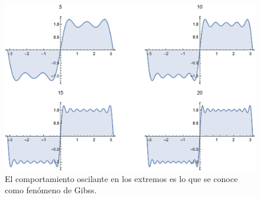 \documentclass[12pt]{article}
\numberwithin{equation}{section}
\begin{document}
\begin{figure}
  \centering
  \includegraphics[scale=0.7]{Imagenes/Gibbs_Fourier.eps}
  \caption{El comportamiento oscilante en los extremos es lo que se conoce como fenómeno de Gibss.}
  \label{fig:figura_fenomeno_Gibss}
\end{figure}
\end{document}

